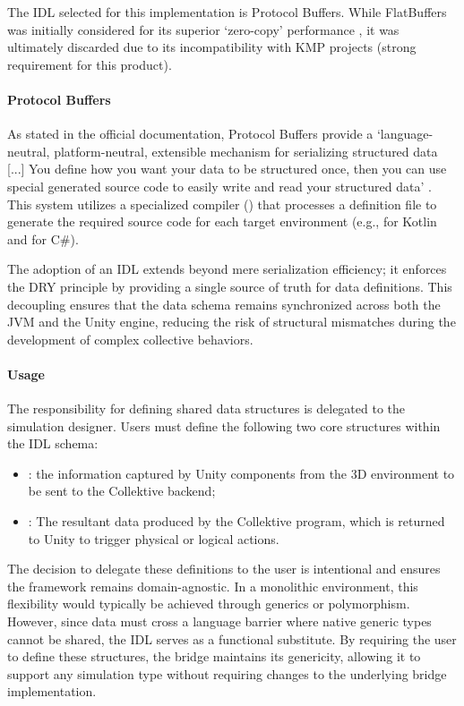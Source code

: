 The \ac{IDL} selected for this implementation is Protocol Buffers. While FlatBuffers was initially considered for its superior `zero-copy' performance \cite{google_flatbuffers_2014}, it was ultimately discarded due to its incompatibility with \ac{KMP} projects (strong requirement for this product).

\paragraph{Protocol Buffers}
As stated in the official documentation, Protocol Buffers provide a `language-neutral, platform-neutral, extensible mechanism for serializing structured data [...] You define how you want your data to be structured once, then you can use special generated source code to easily write and read your structured data' \cite{google_protobuf_2024}. This system utilizes a specialized compiler () that processes a  definition file to generate the required source code for each target environment (e.g.,  for Kotlin and  for C\#).

The adoption of an \ac{IDL} extends beyond mere serialization efficiency; it enforces the \ac{DRY} principle by providing a single source of truth for data definitions. This decoupling ensures that the data schema remains synchronized across both the \ac{JVM} and the Unity engine, reducing the risk of structural mismatches during the development of complex collective behaviors.

\paragraph{Usage}
The responsibility for defining shared data structures is delegated to the simulation designer. Users must define the following two core structures within the \ac{IDL} schema:

\begin{itemize}
	\item {}: the information captured by Unity components from the 3D environment to be sent to the Collektive backend;
	\item {}: The resultant data produced by the Collektive program, which is returned to Unity to trigger physical or logical actions.
\end{itemize}

The decision to delegate these definitions to the user is intentional and ensures the framework remains domain-agnostic. In a monolithic environment, this flexibility would typically be achieved through generics or polymorphism. However, since data must cross a language barrier where native generic types cannot be shared, the \ac{IDL} serves as a functional substitute. By requiring the user to define these structures, the bridge maintains its genericity, allowing it to support any simulation type without requiring changes to the underlying bridge implementation.

